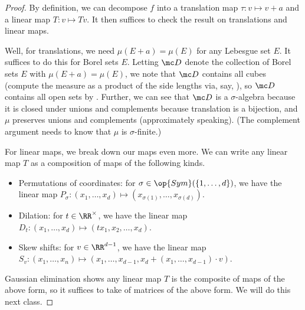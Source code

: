 \documentclass[../notes.tex]{subfiles}
\begin{document}
\begin{proof}
	By definition, we can decompose $f$ into a translation map $\tau\colon v\mapsto v+a$ and a linear map $T\colon v\mapsto Tv$. It then suffices to check the result on translations and linear maps.
	
	Well, for translations, we need $\mu(E+a)=\mu(E)$ for any Lebesgue set $E$. It suffices to do this for Borel sets $E$. Letting $\mc D$ denote the collection of Borel sets $E$ with $\mu(E+a)=\mu(E)$, we note that $\mc D$ contains all cubes (compute the measure as a product of the side lengths via, say, ), so $\mc D$ contains all open sets by . Further, we can see that $\mc D$ is a $\sigma$-algebra because it is closed under unions and complements because translation is a bijection, and $\mu$ preserves unions and complements (approximately speaking). (The complement argument needs to know that $\mu$ is $\sigma$-finite.)

	For linear maps, we break down our maps even more. We can write any linear map $T$ as a composition of maps of the following kinds.
	\begin{itemize}
		\item Permutations of coordinates: for $\sigma\in\op{Sym}(\{1,\ldots,d\})$, we have the linear map $P_\sigma\colon(x_1,\ldots,x_d)\mapsto(x_{\sigma(1)},\ldots,x_{\sigma(d)})$.
		\item Dilation: for $t\in\RR^\times$, we have the linear map $D_t\colon(x_1,\ldots,x_d)\mapsto(tx_1,x_2,\ldots,x_d)$.
		\item Skew shifts: for $v\in\RR^{d-1}$, we have the linear map $S_v\colon(x_1,\ldots,x_n)\mapsto(x_1,\ldots,x_{d-1},x_d+(x_1,\ldots,x_{d-1})\cdot v)$.
	\end{itemize}
	Gaussian elimination shows any linear map $T$ is the composite of maps of the above form, so it suffices to take of matrices of the above form. We will do this next class.
\end{proof}
\end{document}
